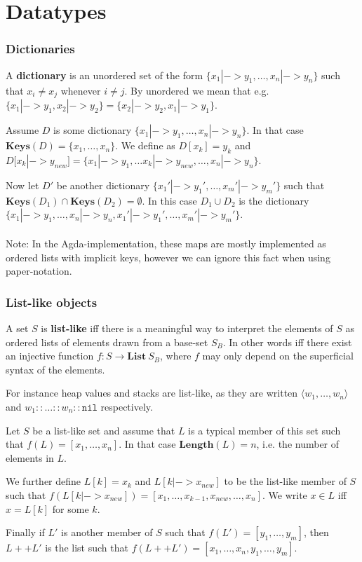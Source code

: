 \section{Datatypes}

\subsubsection{Dictionaries}
A \textbf{dictionary} is an unordered set of the form
$\{x_1 |-> y_1, \dots, x_n |-> y_n\}$ such that $x_i \neq x_j$ whenever
$i \neq j$. By unordered we mean that e.g.
$\{x_1 |-> y_1, x_2 |-> y_2\} = \{x_2 |-> y_2, x_1 |-> y_1\}$.

Assume $D$ is some dictionary $\{x_1 |-> y_1, \dots, x_n |-> y_n\}$. In that
case $\mathbf{Keys}(D) = \{x_1, \dots, x_n\}$. We define as $D[x_k] = y_k$ and
$D[x_k |-> y_{new}] = \{x_1 |-> y_1, \dots x_k |-> y_{new}, \dots, x_n |->
y_n\}$.

Now let $D'$ be another dictionary $\{x_1' |-> y_1', \dots, x_m' |-> y_m'\}$
such that $\mathbf{Keys}(D_1) \cap \mathbf{Keys}(D_2) = \emptyset$. In this case
$D_1 \cup D_2$ is the dictionary
$\{x_1 |-> y_1, \dots, x_n |-> y_n, x_1' |-> y_1', \dots, x_m' |-> y_m'\}$.

\paragraph{}
Note: In the Agda-implementation, these maps are mostly implemented as ordered
lists with implicit keys, however we can ignore this fact when using
paper-notation.

\subsubsection{List-like objects}
A set $S$ is \textbf{list-like} iff there is a meaningful way to interpret the
elements of $S$ as ordered lists of elements drawn from a base-set $S_B$. In
other words iff there exist an injective function
$f : S \to \mathbf{List}\ S_B$, where $f$ may only depend on the superficial
syntax of the elements.

For instance heap values and stacks are list-like, as they are written
$\langle w_1, \dots, w_n \rangle$ and $w_1 :: \dots :: w_n :: \mathtt{nil}$
respectively.

Let $S$ be a list-like set and assume that $L$ is a typical member of this set
such that $f(L) = [x_1, \dots, x_n]$. In that case $\mathbf{Length}(L) = n$,
i.e. the number of elements in $L$.

We further define $L[k] = x_k$ and $L[k |-> x_{new}]$ to be the list-like member
of $S$ such that
$f(L[k |-> x_{new}]) = [x_1, \dots, x_{k-1}, x_{new}, \dots, x_n]$. We write
$x \in L$ iff $x = L[k]$ for some $k$.

Finally if $L'$ is another member of $S$ such that $f(L') = [y_1, \dots, y_m]$,
then $L ++ L'$ is the list such that
$f(L ++ L') = [x_1, \dots, x_n, y_1, \dots, y_m]$.

